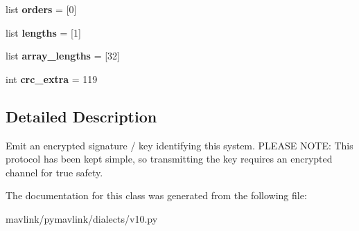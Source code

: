 \begin{DoxyCompactItemize}
list {\bfseries orders} = \mbox{[}0\mbox{]}
\item 
\mbox{\label{classpymavlink_1_1dialects_1_1v10_1_1MAVLink__auth__key__message_a979ab7d5d80cfc7ec2c0efdebef556ca}} 
list {\bfseries lengths} = \mbox{[}1\mbox{]}
\item 
\mbox{\label{classpymavlink_1_1dialects_1_1v10_1_1MAVLink__auth__key__message_a82b803d5f5c384b2c64af35c1631fa0b}} 
list {\bfseries array\+\_\+lengths} = \mbox{[}32\mbox{]}
\item 
\mbox{\label{classpymavlink_1_1dialects_1_1v10_1_1MAVLink__auth__key__message_ad962fa10c91f7696b75da01f81258e66}} 
int {\bfseries crc\+\_\+extra} = 119
\end{DoxyCompactItemize}


\subsection{Detailed Description}
\begin{DoxyVerb}Emit an encrypted signature / key identifying this system.
PLEASE NOTE: This protocol has been kept simple, so
transmitting the key requires an encrypted channel for true
safety.
\end{DoxyVerb}
 

The documentation for this class was generated from the following file\+:\begin{DoxyCompactItemize}
\item 
mavlink/pymavlink/dialects/v10.\+py\end{DoxyCompactItemize}
